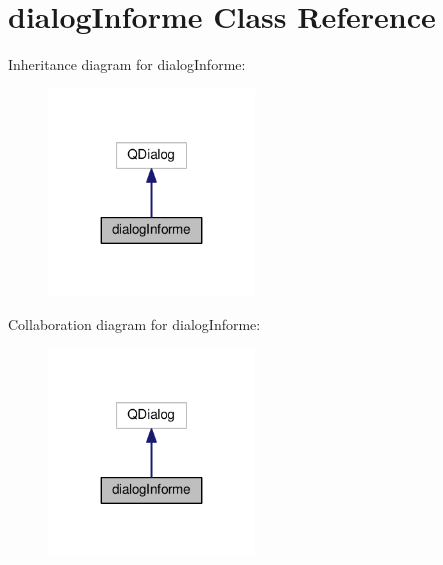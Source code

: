 \hypertarget{classdialogInforme}{}\section{dialog\+Informe Class Reference}
\label{classdialogInforme}


Inheritance diagram for dialog\+Informe\+:
\nopagebreak
\begin{figure}[H]
\begin{center}
\leavevmode
\includegraphics[width=155pt]{classdialogInforme__inherit__graph}
\end{center}
\end{figure}


Collaboration diagram for dialog\+Informe\+:
\nopagebreak
\begin{figure}[H]
\begin{center}
\leavevmode
\includegraphics[width=155pt]{classdialogInforme__coll__graph}
\end{center}
\end{figure}
